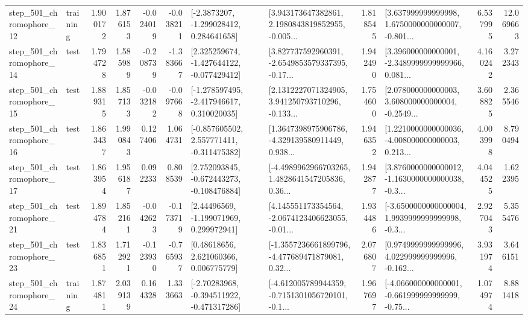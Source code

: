 \begin{tabular}{llrrrrllrlrr}
  step\_501\_chromophore\_12 &  training &      1.900172 &    1.876153 &     -0.024019 & -0.038211 &     [-2.3873207, -1.299028412, 0.284641658] &  [3.943173647382861, 2.1980843819852955, -0.005... &       1.818545 &  [3.637999999999998, 1.6750000000000007, -0.801... &            6.537995 &         12.069663 \\
  step\_501\_chromophore\_14 &      test &      1.794728 &    1.585989 &     -0.208739 & -1.383667 &   [2.325259674, -1.427644122, -0.077429412] &  [3.827737592960391, -2.6549853579337395, -0.17... &       1.942490 &  [3.396000000000001, -2.3489999999999966, 0.081... &            4.160242 &          3.272343 \\
  step\_501\_chromophore\_15 &      test &      1.889315 &    1.857133 &     -0.032182 & -0.097668 &   [-1.278597495, -2.417946617, 0.310020035] &  [2.1312227071324905, 3.941250793710296, -0.133... &       1.754600 &  [2.078000000000003, 3.608000000000004, -0.2549... &            3.608825 &          2.365546 \\
  step\_501\_chromophore\_16 &      test &      1.863437 &    1.990843 &      0.127406 &  1.064731 &   [-0.857605502, 2.557771411, -0.311475382] &  [1.3647398975906786, -4.329139580911449, 0.938... &       1.946352 &  [1.2210000000000036, -4.008000000000003, 0.213... &            4.003998 &          8.790494 \\
  step\_501\_chromophore\_17 &      test &      1.863954 &    1.956187 &      0.092233 &  0.808539 &   [2.752093845, -0.672443273, -0.108476884] &  [-4.4989962966703265, 1.4828641547205836, 0.36... &       1.942877 &  [3.8760000000000012, -1.1630000000000038, -0.3... &            4.044525 &          1.622395 \\
  step\_501\_chromophore\_21 &      test &      1.894784 &    1.852161 &     -0.042623 & -0.173719 &     [2.44496569, -1.199071969, 0.299972941] &  [4.145551173354564, -2.0674123406623055, -0.01... &       1.934486 &  [-3.6500000000000004, 1.9939999999999998, -0.3... &            2.927043 &          5.355476 \\
  step\_501\_chromophore\_23 &      test &      1.836851 &    1.712921 &     -0.123930 & -0.765937 &      [0.48618656, 2.621060366, 0.006775779] &  [-1.3557236661899796, -4.477689471879081, 0.32... &       2.076807 &  [0.9749999999999996, 4.022999999999996, -0.162... &            3.931974 &          3.646151 \\
  step\_501\_chromophore\_24 &  training &      1.874811 &    2.039139 &      0.164328 &  1.333663 &   [-2.70283968, -0.394511922, -0.471317286] &  [-4.612005789944359, -0.7151301056720101, -0.1... &       1.967697 &  [-4.066000000000001, -0.661999999999999, -0.75... &            1.074974 &          8.881418 \\

\end{tabular}
